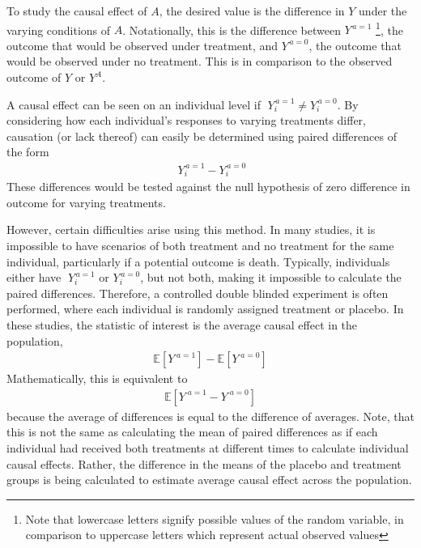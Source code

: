 To study the causal effect of $A$, the desired value is the difference in $Y$ under the varying conditions of $A$.  Notationally, this is the difference between $Y^{\, a=1}$ \footnote{Note that lowercase letters signify possible values of the random variable, in comparison to uppercase letters which represent actual observed values},  the outcome that would be observed under treatment, and $Y^{\, a=0}$, the outcome that would be observed under no treatment.  This is in comparison to the observed outcome of $Y$ or $Y^A$.  

A causal effect can be seen on an individual level if $\; Y_i^{\, a=1} \neq Y_i^{\, a=0}$.  By considering how each individual's responses to varying treatments differ, causation (or lack thereof) can easily be determined using paired differences of the form 
\begin{align} \; Y_i^{\, a=1} - Y_i^{\, a=0}\end{align} 
These differences would be tested against the null hypothesis of zero difference in outcome for varying treatments.  

However, certain difficulties arise using this method.  In many studies, it is impossible to have scenarios of both treatment and no treatment for the same individual, particularly if a potential outcome is death.  Typically, individuals either have $\; Y_i^{\, a=1}$ or  $Y_i^{\, a=0}$, but not both, making it impossible to calculate the paired differences.  Therefore, a controlled double blinded experiment is often performed, where each individual is randomly assigned treatment or placebo.  In these studies, the statistic of interest is the average causal effect in the population, 
\begin{align}  \mathbb{E}[Y^{\; a=1}] - \mathbb{E}[Y^{\; a=0}] \end{align} 
Mathematically, this is equivalent to 
\begin{align}  \mathbb{E}[Y^{\; a=1} - Y^{\; a=0}] \end{align}  
because the average of differences is equal to the difference of averages.\cite{hernan_robins_2016} Note, that this is not the same as calculating the mean of paired differences as if each individual had received both treatments at different times to calculate individual causal effects.  Rather, the difference in the means of the placebo and treatment groups is being calculated to estimate average causal effect across the population.  

